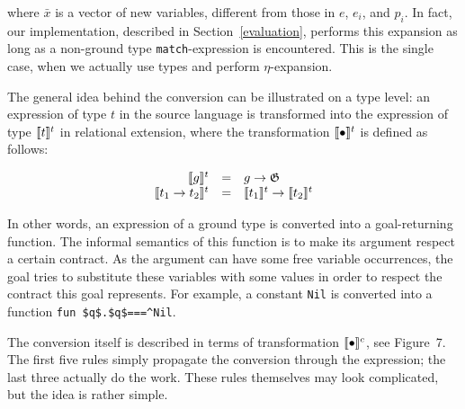 \noindent where $\bar{x}$ is a vector of new variables, different from those in $e$, $e_i$, and $p_i$. In fact, our implementation,
described in Section~\ref{evaluation}, performs this expansion as long as a non-ground type \lstinline|match|-expression is encountered. 
This is the single case, when we actually use types and perform $\eta$-expansion.

The general idea behind the conversion can be illustrated on a type level: an expression of type $t$ in the source
language is transformed into the expression of type $\llbracket{t}\rrbracket^t$ in relational extension, where
the transformation $\llbracket{\bullet}\rrbracket^t$ is defined as follows:

$$
\begin{array}{rcl}
\llbracket{g}\rrbracket^t                     & = & g \to \mathfrak G \\
\llbracket{t_1 \to t_2}\rrbracket^t           & = & \llbracket{t_1}\rrbracket^t \to \llbracket{t_2}\rrbracket^t \\
\end{array}
$$

In other words, an expression of a ground type is converted into a goal-returning function. The informal semantics
of this function is to make its argument respect a certain contract. As the argument can have some free variable occurrences, 
the goal tries to substitute these variables with some values in order to respect the contract this goal represents. 
For example, a constant \lstinline|Nil| is converted into a function \lstinline|fun $q$.$q$===^Nil|.

The conversion itself is described in terms of transformation $\llbracket{\bullet}\rrbracket^c$, see Figure~7.%
The first five rules
simply propagate the conversion through the expression; the last three actually do the work. These rules themselves may look complicated,
but the idea is rather simple.

